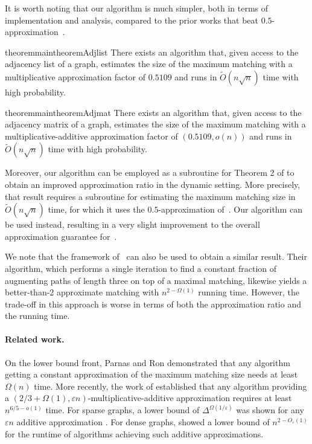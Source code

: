 \documentclass[letterpaper,11pt]{article}
\renewcommand{\epsilon}{\varepsilon}
\newcommand{\wt}[1]{\ensuremath{\widetilde{#1}}}
\begin{document}
It is worth noting that our algorithm is much simpler, both in terms of implementation and analysis,  compared to the prior works that beat $0.5$-approximation~\cite{BehnezhadRRS23}.







\begin{restatable}{theorem}{maintheoremAdjlist}\label{thm:adj-list-theorem}
There exists an algorithm that, given access to the adjacency list of a graph, estimates the size of the maximum matching with a multiplicative approximation factor of $0.5109$ and runs in $\widetilde{O}(n\sqrt{n})$ time with high probability.
\end{restatable}


\begin{restatable}{theorem}{maintheoremAdjmat}\label{thm:adj-mat-theorem}
There exists an algorithm that, given access to the adjacency matrix of a graph, estimates the size of the maximum matching with a multiplicative-additive approximation factor of $(0.5109, o(n))$ and runs in $\widetilde{O}(n\sqrt{n})$ time with high probability.
\end{restatable}

Moreover, our algorithm can be employed as a subroutine for Theorem 2 of \cite{Behnezhad23} to obtain an improved approximation ratio in the dynamic setting.
More precisely, that result requires a subroutine for estimating the maximum matching size in $\wt{O}(n\sqrt{n})$ time,
for which it uses the $0.5$-approximation of~\cite{Behnezhad21}.
Our algorithm can be used instead, resulting in a very slight improvement to the overall approximation guarantee for~\cite{Behnezhad23}.




We note that the framework of~\cite{bhattacharya2023dynamic} can also be used to obtain a similar result. Their algorithm, which performs a single iteration to find a constant fraction of augmenting paths of length three on top of a maximal matching, likewise yields a better-than-2 approximate matching with $n^{2 - \Omega(1)}$ running time. However, the trade-off in this approach is worse in terms of both the approximation ratio and the running time.


\paragraph{Related work.} On the lower bound front, Parnas and Ron \cite{ParnasRon07} demonstrated that any algorithm getting a constant approximation of the maximum matching size needs at least $\Omega(n)$ time. More recently, the work of \cite{behnezhad2023sublinear} established that any algorithm providing a $(2/3 + \Omega(1), \epsilon n)$-multiplicative-additive approximation requires at least $n^{6/5-o(1)}$ time. For sparse graphs, a lower bound of $\Delta^{\Omega(1/\epsilon)}$ was shown for any $\epsilon n$ additive approximation \cite{behnezhad2023local}. For dense graphs, \cite{behnezhad2024approximating} showed a lower bound of $n^{2-O_\epsilon(1)}$ for the runtime of algorithms achieving such additive approximations.
\end{document}

